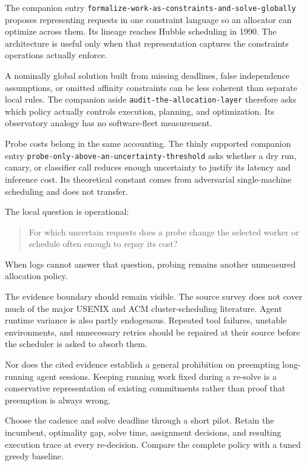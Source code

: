 The companion entry \texttt{formalize-work-as-constraints-and-solve-globally} proposes representing requests in one constraint language so an allocator can optimize across them. Its lineage reaches Hubble scheduling in 1990. The architecture is useful only when that representation captures the constraints operations actually enforce.

A nominally global solution built from missing deadlines, false independence assumptions, or omitted affinity constraints can be less coherent than separate local rules. The companion aside \texttt{audit-the-allocation-layer} therefore asks which policy actually controls execution, planning, and optimization. Its observatory analogy has no software-fleet measurement.

Probe costs belong in the same accounting. The thinly supported companion entry \texttt{probe-only-above-an-uncertainty-threshold} asks whether a dry run, canary, or classifier call reduces enough uncertainty to justify its latency and inference cost. Its theoretical constant comes from adversarial single-machine scheduling and does not transfer.

The local question is operational:

\begin{quote}
For which uncertain requests does a probe change the selected worker or schedule often enough to repay its cost?
\end{quote}

When logs cannot answer that question, probing remains another unmeasured allocation policy.

The evidence boundary should remain visible. The source survey does not cover much of the major USENIX and ACM cluster-scheduling literature. Agent runtime variance is also partly endogenous. Repeated tool failures, unstable environments, and unnecessary retries should be repaired at their source before the scheduler is asked to absorb them.

Nor does the cited evidence establish a general prohibition on preempting long-running agent sessions. Keeping running work fixed during a re-solve is a conservative representation of existing commitments rather than proof that preemption is always wrong.

Choose the cadence and solve deadline through a short pilot. Retain the incumbent, optimality gap, solve time, assignment decisions, and resulting execution trace at every re-decision. Compare the complete policy with a tuned greedy baseline.


